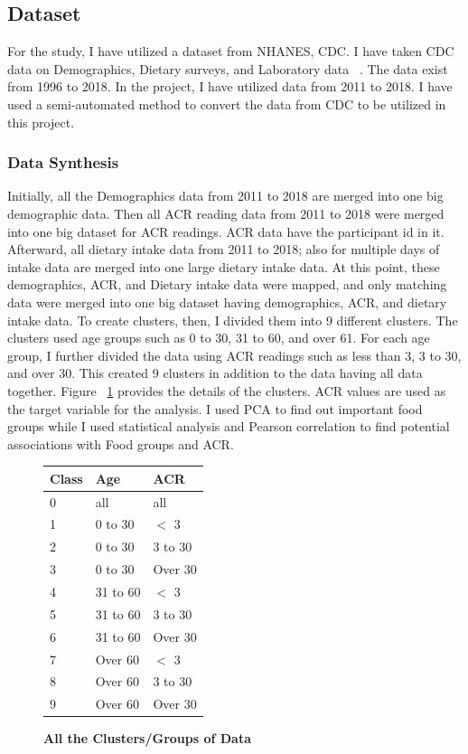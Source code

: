 \subsection {Dataset}
For the study, I have utilized a dataset from NHANES, CDC. I have taken CDC data on Demographics, Dietary surveys, and Laboratory data ~\cite{CDCDataset}. The data exist from 1996 to 2018. In the project, I have utilized data from 2011 to 2018. I have used a semi-automated method to convert the data from CDC to be utilized in this project.


\subsubsection{Data Synthesis}
\noindent Initially, all the Demographics data from 2011 to 2018 are merged into one big demographic data.
Then all ACR reading data from 2011 to 2018 were merged into one big dataset for ACR readings. ACR data have the participant id in it. Afterward, all dietary intake data from 2011 to 2018; also for multiple days of intake data are merged into one large dietary intake data. At this point, these demographics, ACR, and Dietary intake data were mapped, and only matching data were merged into one big dataset having demographics, ACR, and dietary intake data. To create clusters, then, I divided them into 9 different clusters. The clusters used age groups such as 0 to 30, 31 to 60, and over 61. For each age group, I further divided the data using ACR readings such as less than 3, 3 to 30, and over 30. This created 9 clusters in addition to the data having all data together. Figure ~\ref{clusters-table} provides the details of the clusters. ACR values are used as the target variable for the analysis. I used PCA to find out important food groups while I used statistical analysis and Pearson correlation to find potential associations with Food groups and ACR.


\begin{figure}
\begin{tabular}{|p{4cm}|p{6cm}|p{6cm}|}
\hline
\textbf{Class} & \textbf{Age} & \textbf{ACR}\\
\hline
0 & all & all \\
\hline
1 & 0 to 30 & $<$ 3 \\
\hline
2 & 0 to 30 & 3 to 30 \\
\hline
3 & 0 to 30 & Over 30 \\
\hline
4 & 31 to 60 & $<$ 3 \\
\hline
5 & 31 to 60 & 3 to 30 \\
\hline
6 & 31 to 60 & Over 30 \\
\hline
7 & Over 60 & $<$ 3 \\
\hline
8 & Over 60 & 3 to 30\\
\hline
9 & Over 60 & Over 30\\
\hline

\end{tabular}
\caption{\textbf{All the Clusters/Groups of Data}}
\label{clusters-table}
\vspace{0.25cm}
\end{figure}

